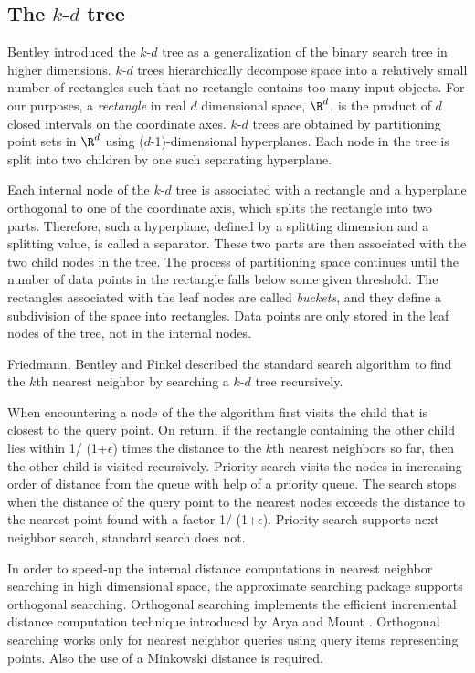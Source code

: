 \subsection{The $k$-$d$ tree}
\label{KDT_section}

Bentley \cite{b-mbstu-75} introduced the $k$-$d$ tree as a generalization of the binary
search tree in higher dimensions. $k$-$d$ trees hierarchically decompose space into a
relatively small number of rectangles such that no rectangle contains too many input objects.
For our purposes, a {\it rectangle} in real $d$ dimensional space, $\R^d$, is the product of $d$ closed
intervals on the coordinate axes.
$k$-$d$ trees are obtained by partitioning point sets in $\R^d$ using
($d$-1)-dimensional hyperplanes.
Each node in the tree is split into two children by one such separating hyperplane.

Each internal node of the $k$-$d$ tree is associated with a rectangle
and a hyperplane orthogonal to
one of the coordinate axis, which splits the rectangle into two parts.
Therefore, such a hyperplane, defined by a splitting dimension
and a splitting value, is called a separator.
These two parts are then associated
with the two child nodes in the tree. The process of partitioning space continues until the number of data
points in the rectangle falls below some given threshold. The rectangles associated with the leaf nodes
are called {\it buckets}, and they define a subdivision of the space into rectangles.
Data points are only stored in the leaf nodes of the tree, not in the internal nodes.

Friedmann, Bentley and Finkel \cite{fbf-afbml-77} described the standard
search algorithm to find the $k$th nearest neighbor by searching a $k$-$d$ tree recursively.

When encountering a node of the  the algorithm first visits the child that is closest
to the query point. On return, if the rectangle containing  the other child lies within
1/ (1+$\epsilon$) times the distance to the $k$th nearest neighbors so far, then
the other child is visited recursively.
Priority search \cite{am-annqf-93} visits the nodes in increasing order of distance from
the queue with help of a priority queue.
The search stops when the distance of the query point to the nearest nodes
exceeds the distance to the nearest point found with a factor 1/ (1+$\epsilon$).
Priority search supports next neighbor search, standard search does not.

In order to speed-up the internal distance computations in nearest neighbor searching
in high dimensional space, the approximate searching package supports orthogonal searching. Orthogonal
searching implements the efficient incremental distance computation
technique introduced by Arya and Mount \cite{am-afvq-93}.
Orthogonal searching works only for nearest neighbor queries using query items representing
points. Also the use of a Minkowski distance is required.


